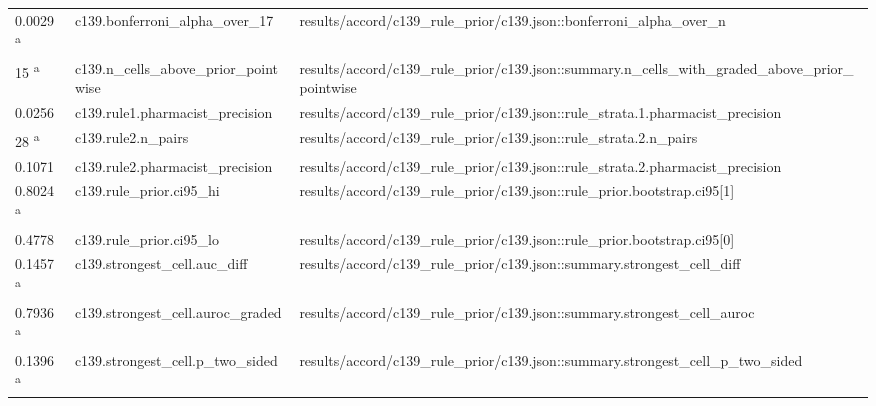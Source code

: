 \begin{longtable}{@{}p{0.7in}p{1.9in}p{2.6in}@{}}
0.0029 \textsuperscript{a} & c139.\allowbreak{}bonferroni\_alpha\_over\_17 & results/\allowbreak{}accord/\allowbreak{}c139\_rule\_prior/\allowbreak{}c139.\allowbreak{}json::bonferroni\_alpha\_over\_n\\
15 \textsuperscript{a} & c139.\allowbreak{}n\_cells\_above\_prior\_pointwise & results/\allowbreak{}accord/\allowbreak{}c139\_rule\_prior/\allowbreak{}c139.\allowbreak{}json::summary.\allowbreak{}n\_cells\_with\_graded\_above\_prior\_pointwise\\
0.0256 & c139.\allowbreak{}rule1.\allowbreak{}pharmacist\_precision & results/\allowbreak{}accord/\allowbreak{}c139\_rule\_prior/\allowbreak{}c139.\allowbreak{}json::rule\_strata.\allowbreak{}1.\allowbreak{}pharmacist\_precision\\
28 \textsuperscript{a} & c139.\allowbreak{}rule2.\allowbreak{}n\_pairs & results/\allowbreak{}accord/\allowbreak{}c139\_rule\_prior/\allowbreak{}c139.\allowbreak{}json::rule\_strata.\allowbreak{}2.\allowbreak{}n\_pairs\\
0.1071 & c139.\allowbreak{}rule2.\allowbreak{}pharmacist\_precision & results/\allowbreak{}accord/\allowbreak{}c139\_rule\_prior/\allowbreak{}c139.\allowbreak{}json::rule\_strata.\allowbreak{}2.\allowbreak{}pharmacist\_precision\\
0.8024 \textsuperscript{a} & c139.\allowbreak{}rule\_prior.\allowbreak{}ci95\_hi & results/\allowbreak{}accord/\allowbreak{}c139\_rule\_prior/\allowbreak{}c139.\allowbreak{}json::rule\_prior.\allowbreak{}bootstrap.\allowbreak{}ci95[1]\\
0.4778 & c139.\allowbreak{}rule\_prior.\allowbreak{}ci95\_lo & results/\allowbreak{}accord/\allowbreak{}c139\_rule\_prior/\allowbreak{}c139.\allowbreak{}json::rule\_prior.\allowbreak{}bootstrap.\allowbreak{}ci95[0]\\
0.1457 \textsuperscript{a} & c139.\allowbreak{}strongest\_cell.\allowbreak{}auc\_diff & results/\allowbreak{}accord/\allowbreak{}c139\_rule\_prior/\allowbreak{}c139.\allowbreak{}json::summary.\allowbreak{}strongest\_cell\_diff\\
0.7936 \textsuperscript{a} & c139.\allowbreak{}strongest\_cell.\allowbreak{}auroc\_graded & results/\allowbreak{}accord/\allowbreak{}c139\_rule\_prior/\allowbreak{}c139.\allowbreak{}json::summary.\allowbreak{}strongest\_cell\_auroc\\
0.1396 \textsuperscript{a} & c139.\allowbreak{}strongest\_cell.\allowbreak{}p\_two\_sided & results/\allowbreak{}accord/\allowbreak{}c139\_rule\_prior/\allowbreak{}c139.\allowbreak{}json::summary.\allowbreak{}strongest\_cell\_p\_two\_sided\\

\end{longtable}
